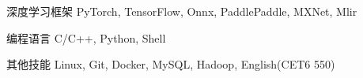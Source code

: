 

\begin{cvskills}

  \cvskill
    {深度学习框架} %
    {PyTorch, TensorFlow, Onnx, PaddlePaddle, MXNet, Mlir} %

  \cvskill
    {编程语言} %
    {C/C++, Python, Shell} %

  \cvskill
    {其他技能} %
    {Linux, Git, Docker, MySQL, Hadoop, English(CET6 550)} %

\end{cvskills}
